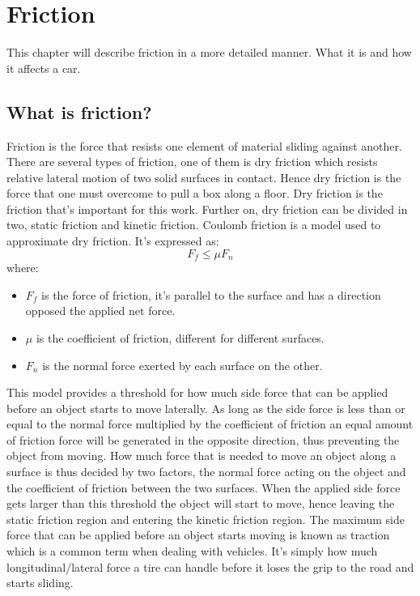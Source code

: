 \chapter{Friction}
This chapter will describe friction in a more detailed manner. What it is and how it affects a car.

\section{What is friction?}
Friction is the force that resists one element of material sliding against another. There are several types of friction, one of them is dry friction which resists relative lateral motion of two solid surfaces in contact. Hence dry friction is the force that one must overcome to pull a box along a floor. Dry friction is the friction that's important for this work. Further on, dry friction can be divided in two, static friction and kinetic friction. Coulomb friction is a model used to approximate dry friction. It's expressed as:
\begin{equation} \label{eq:friction}
F_{f}\leq\mu F_{n}
\end{equation}
where:
\begin{itemize}
	\item $ F_{f} $ is the force of friction, it's parallel to the surface and has a direction opposed the applied net force.
	\item $ \mu $ is the coefficient of friction, different for different surfaces.
	\item $ F_{n} $ is the normal force exerted by each surface on the other.
\end{itemize}
This model provides a threshold for how much side force that can be applied before an object starts to move laterally. As long as the side force is less than or equal to the normal force multiplied by the coefficient of friction an equal amount of friction force will be generated in the opposite direction, thus preventing the object from moving. How much force that is needed to move an object along a surface is thus decided by two factors, the normal force acting on the object and the coefficient of friction between the two surfaces. When the applied side force gets larger than this threshold the object will start to move, hence leaving the static friction region and entering the kinetic friction region. The maximum side force that can be applied before an object starts moving is known as traction which is a common term when dealing with vehicles. It's simply how much longitudinal/lateral force a tire can handle before it loses the grip to the road and starts sliding.

